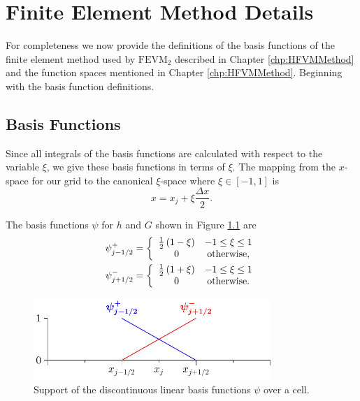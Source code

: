 \chapter{Finite Element Method Details}
\label{app:FEMIntegrals}
For completeness we now provide the definitions of the basis functions of the finite element method used by $\text{FEVM}_2$ described in Chapter \ref{chp:HFVMMethod} and the function spaces mentioned in Chapter \ref{chp:HFVMMethod}. Beginning with the basis function definitions.

\section{Basis Functions}
Since all integrals of the basis functions are calculated with respect to the variable $\xi$, we give these basis functions in terms of $\xi$. The mapping from the $x$-space for our grid to the canonical $\xi$-space where $\xi \in \left[-1,1\right]$ is
\begin{equation*}
x = x_j + \xi \frac{\Delta x}{2}.
\end{equation*}

The basis functions $\psi$ for $h$ and $G$ shown in Figure \ref{fig:P1DiscBasisAPP} are
\begin{subequations}
	\label{eqn:App1:PsiDef}
\begin{align}
\psi^+_{j-1/2} &= \left\lbrace \begin{array}{c c}
\frac{1}{2}\left(1 - \xi\right) & -1 \le \xi \le 1\\
0 & \text{otherwise} ,
\end{array} \right.  \\
\psi^-_{j+1/2} &= \left\lbrace \begin{array}{c c}
\frac{1}{2}\left(1 + \xi\right) & -1 \le \xi \le 1\\
0 & \text{otherwise} .
\end{array} \right. 
\end{align}
\end{subequations}

\begin{figure}
	\centering
	\includegraphics[width=0.8\textwidth]{./chp3/figures/P1.pdf}
	\caption{Support of the discontinuous linear basis functions $\psi$ over a cell.}
	\label{fig:P1DiscBasisAPP}
\end{figure}

